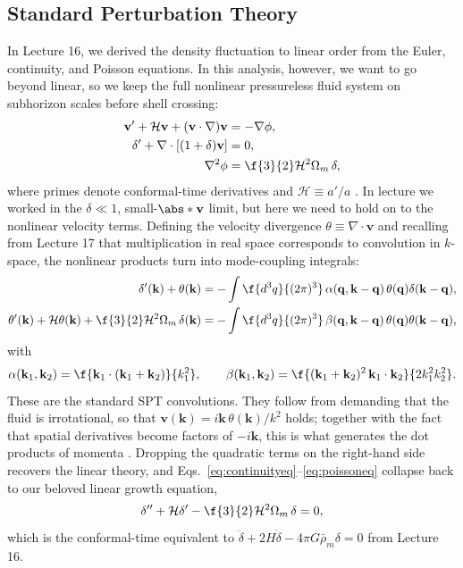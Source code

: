 \subsection{Standard Perturbation Theory}
\label{subsec:spt}
In Lecture 16, we derived the density fluctuation to linear order from the 
Euler, continuity, and Poisson equations. In this analysis, however, we want to go beyond linear, so we keep the full nonlinear pressureless fluid system on subhorizon scales before shell crossing:
\begin{align}
    \mathbf{v}'+\mathcal{H}\mathbf{v}+(\mathbf{v}\cdot\nabla)\mathbf{v}
    &=-\nabla\phi,\label{eq:eulereq}\\
    \delta'+\nabla\cdot[(1+\delta)\mathbf{v}] &= 0,\label{eq:continuityeq}\\
    \nabla^2\phi&=\f{3}{2}\mathcal{H}^2\Omega_m\,\delta,\label{eq:poissoneq}
\end{align}
where primes denote conformal-time derivatives and 
$\mathcal{H}\equiv a'/a$ \citep{Bernardeau2002,Baldauf2020}. In lecture we 
worked in the $\delta\ll1$, small-$\abs*{\mathbf{v}}$ limit, but here we 
need to hold on to the nonlinear velocity terms. Defining the velocity 
divergence $\theta\equiv\nabla\cdot\mathbf{v}$ and recalling from Lecture 
17 \citep{Dvorkin2026} that multiplication in real space corresponds to 
convolution in $k$-space, the nonlinear products turn into mode-coupling 
integrals:
\begin{align}
    \delta'(\mathbf{k})+\theta(\mathbf{k})
    &=-\int\f{d^3q}{(2\pi)^3}\,
    \alpha(\mathbf{q},\mathbf{k}-\mathbf{q})\,
    \theta(\mathbf{q})\delta(\mathbf{k}-\mathbf{q}),\\
    \theta'(\mathbf{k})+\mathcal{H}\theta(\mathbf{k})
    +\f{3}{2}\mathcal{H}^2\Omega_m\,\delta(\mathbf{k})
    &=-\int\f{d^3q}{(2\pi)^3}\,
    \beta(\mathbf{q},\mathbf{k}-\mathbf{q})\,
    \theta(\mathbf{q})\theta(\mathbf{k}-\mathbf{q}),
\end{align}
with
\begin{equation}
    \alpha(\mathbf{k}_1,\mathbf{k}_2)
    =\f{\mathbf{k}_1\cdot(\mathbf{k}_1+\mathbf{k}_2)}{k_1^2},
    \qquad
    \beta(\mathbf{k}_1,\mathbf{k}_2)
    =\f{(\mathbf{k}_1+\mathbf{k}_2)^2\,\mathbf{k}_1\cdot\mathbf{k}_2}{2k_1^2k_2^2}.
\end{equation}
These are the standard SPT convolutions. They follow from demanding that 
the fluid is irrotational, so that $\mathbf{v}(\mathbf{k})=i\mathbf{k}\,\theta(\mathbf{k})/k^2$ 
holds; together with the fact that spatial derivatives become factors of 
$-i\mathbf{k}$, this is what generates the dot products of momenta \citep{Bernardeau2002,Baldauf2020}. 
Dropping the quadratic terms on the right-hand side recovers the linear 
theory, and Eqs.~\eqref{eq:continuityeq}--\eqref{eq:poissoneq} collapse 
back to our beloved linear growth equation,
\begin{equation}
    \delta''+\mathcal{H}\delta'-\f{3}{2}\mathcal{H}^2\Omega_m\,\delta=0,
\end{equation}
which is the conformal-time equivalent to
$\ddot{\delta}+2H\dot{\delta}-4\pi G\bar{\rho}_m\delta=0$ from Lecture 16.

